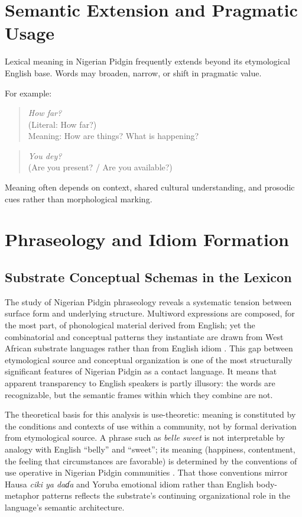 \documentclass[12pt]{article}
\begin{document}
\section{Semantic Extension and Pragmatic Usage}

Lexical meaning in Nigerian Pidgin frequently extends beyond its etymological English base. Words may broaden, narrow, or shift in pragmatic value.

For example:

\begin{quote}
\textit{How far?} \\
(Literal: How far?) \\
Meaning: How are things? What is happening?
\end{quote}

\begin{quote}
\textit{You dey?} \\
(Are you present? / Are you available?)
\end{quote}

Meaning often depends on context, shared cultural understanding, and prosodic cues rather than morphological marking.

\section{Phraseology and Idiom Formation}

\subsection{Substrate Conceptual Schemas in the Lexicon}

The study of Nigerian Pidgin phraseology reveals a systematic tension between surface form and underlying structure. Multiword expressions are composed, for the most part, of phonological material derived from English; yet the combinatorial and conceptual patterns they instantiate are drawn from West African substrate languages rather than from English idiom \cite{Frackiewicz2019}. This gap between etymological source and conceptual organization is one of the most structurally significant features of Nigerian Pidgin as a contact language. It means that apparent transparency to English speakers is partly illusory: the words are recognizable, but the semantic frames within which they combine are not.

The theoretical basis for this analysis is use-theoretic: meaning is constituted by the conditions and contexts of use within a community, not by formal derivation from etymological source. A phrase such as \textit{belle sweet} is not interpretable by analogy with English ``belly'' and ``sweet''; its meaning (happiness, contentment, the feeling that circumstances are favorable) is determined by the conventions of use operative in Nigerian Pidgin communities \cite{Frackiewicz2019}. That those conventions mirror Hausa \textit{ciki ya daɗa} and Yoruba emotional idiom rather than English body-metaphor patterns reflects the substrate's continuing organizational role in the language's semantic architecture.
\end{document}
